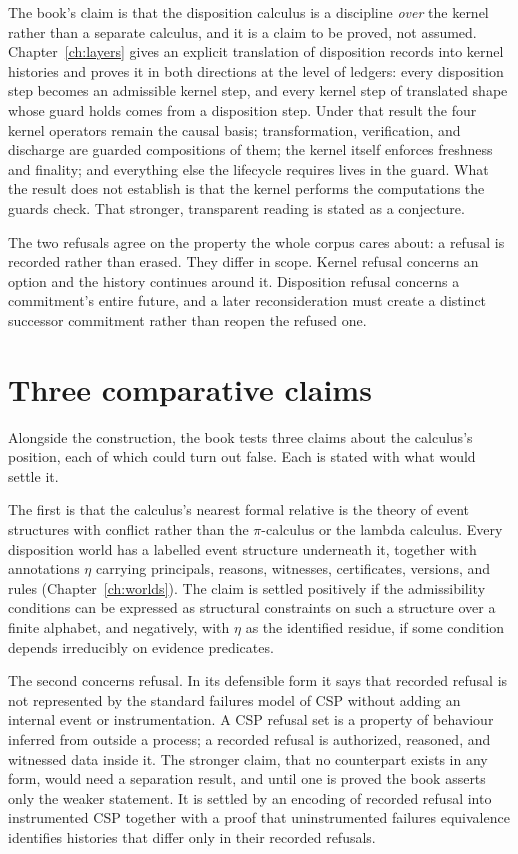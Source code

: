 \documentclass[11pt,openany]{book}
\theoremstyle{remark}
\begin{document}
The book's claim is that the disposition calculus is a discipline
\emph{over} the kernel rather than a separate calculus, and it is a claim
to be proved, not assumed. Chapter~\ref{ch:layers} gives an explicit
translation of disposition records into kernel histories and proves it in
both directions at the level of ledgers: every disposition step becomes an
admissible kernel step, and every kernel step of translated shape whose
guard holds comes from a disposition step. Under that result the four
kernel operators remain the causal basis; transformation, verification,
and discharge are guarded compositions of them; the kernel itself enforces
freshness and finality; and everything else the lifecycle requires lives in
the guard. What the result does not establish is that the kernel performs
the computations the guards check. That stronger, transparent reading is
stated as a conjecture.

The two refusals agree on the property the whole corpus cares about: a
refusal is recorded rather than erased. They differ in scope. Kernel
refusal concerns an option and the history continues around it.
Disposition refusal concerns a commitment's entire future, and a later
reconsideration must create a distinct successor commitment rather than
reopen the refused one.

\section*{Three comparative claims}

Alongside the construction, the book tests three claims about the
calculus's position, each of which could turn out false. Each is stated
with what would settle it.

The first is that the calculus's nearest formal relative is the theory of
event structures with conflict rather than the $\pi$-calculus or the
lambda calculus. Every disposition world has a labelled event structure
underneath it, together with annotations $\eta$ carrying principals,
reasons, witnesses, certificates, versions, and rules
(Chapter~\ref{ch:worlds}). The claim is settled positively if the
admissibility conditions can be expressed as structural constraints on
such a structure over a finite alphabet, and negatively, with $\eta$ as the
identified residue, if some condition depends irreducibly on evidence
predicates.

The second concerns refusal. In its defensible form it says that recorded
refusal is not represented by the standard failures model of CSP without
adding an internal event or instrumentation. A CSP refusal set is a
property of behaviour inferred from outside a process; a recorded refusal
is authorized, reasoned, and witnessed data inside it. The stronger claim,
that no counterpart exists in any form, would need a separation result,
and until one is proved the book asserts only the weaker statement. It is
settled by an encoding of recorded refusal into instrumented CSP together
with a proof that uninstrumented failures equivalence identifies
histories that differ only in their recorded refusals.
\end{document}
